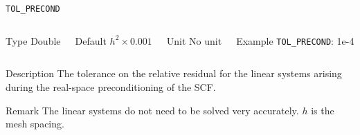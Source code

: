 \begin{frame}[allowframebreaks]{\texttt{TOL\_PRECOND}} \label{TOL_PRECOND}
\vspace*{-12pt}
\begin{columns}
\begin{block}{Type}
Double
\end{block}

\begin{block}{Default}
$h^2\times0.001$
\end{block}

\begin{block}{Unit}
No unit
\end{block}

\begin{block}{Example}
\texttt{TOL\_PRECOND}: 1e-4
\end{block}
\end{columns}

\begin{block}{Description}
The tolerance on the relative residual for the linear systems arising during the real-space preconditioning of the SCF.
\end{block}

\begin{block}{Remark}
The linear systems do not need to be solved very accurately. $h$ is the mesh spacing.
\end{block}

\end{frame}



